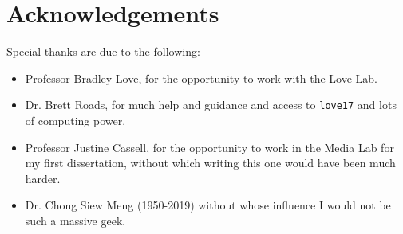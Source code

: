 
\newpage
\section*{Acknowledgements}

Special thanks are due to the following:

\begin{itemize}
    \item Professor Bradley Love, for the opportunity to work with the Love Lab.
    \item Dr. Brett Roads, for much help and guidance and access to \texttt{love17} and lots of computing power. 
    \item Professor Justine Cassell, for the opportunity to work in the Media Lab for my first dissertation, without which writing this one would have been much harder. 
    \item Dr. Chong Siew Meng (1950-2019) without whose influence I would not be such a massive geek. 
\end{itemize}